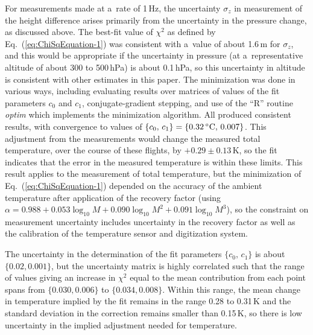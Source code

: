 \documentclass[amtd, online, hvmath]{copernicus}
\begin{document}
For measurements made at a~rate of 1\,Hz, the uncertainty $\sigma_z$
in measurement of the height difference arises primarily from the
uncertainty in the pressure change, as discussed above. The best-fit
value of $\chi^2$ as defined by Eq.~(\ref{eq:ChiSqEquation-1}) was
consistent with a~value of about 1.6\,m for $\sigma_z$, and this would
be appropriate if the uncertainty in pressure (at a~representative
altitude of about 300 to 500\,hPa) is about 0.1\,hPa, so this
uncertainty in altitude is consistent with other estimates in this
paper. The minimization was done in various ways, including evaluating
results over matrices of values of the fit parameters $c_0$ and $c_1$,
conjugate-gradient stepping, and use of the ``R'' routine
\textit{optim} \citep{Rlanguage} which implements the
\citet{NelderMead1965} minimization algorithm. All produced consistent
results, with convergence to values of
$\{c_0,\,c_1\}=\{0.32\,\unit{{\degree}C},\,0.007\}$.  This adjustment
from the measurements would change the measured total temperature,
over the course of these flights, by $+0.29\pm 0.13$\,\unit{K}, so the
fit indicates that the error in the measured temperature is within
these limits. This result applies to the measurement of total
temperature, but the minimization of Eq.~(\ref{eq:ChiSqEquation-1})
depended on the accuracy of the ambient temperature after application
of the recovery factor (using $\alpha = 0.988+0.053
\log_{10}M+0.090\log_{10}M^2+0.091\log_{10}M^3$), so the
constraint on measurement uncertainty includes uncertainty in the
recovery factor as well as the calibration of the temperature sensor
and digitization system.

The uncertainty in the determination of the fit parameters
$\{c_0,\,c_1\}$ is about $\{0.02, 0.001\}$, but the uncertainty matrix
is highly correlated such that the range of values giving an increase
in $\chi^2$ equal to the mean contribution from each point spans from
$\{0.030, 0.006\}$ to $\{0.034, 0.008\}$. Within this range, the mean
change in temperature implied by the fit remains in the range 0.28 to
0.31\,\unit{K} and the standard deviation in the correction remains
smaller than 0.15\,\unit{K}, so there is low uncertainty in the
implied adjustment needed for temperature.
\end{document}
